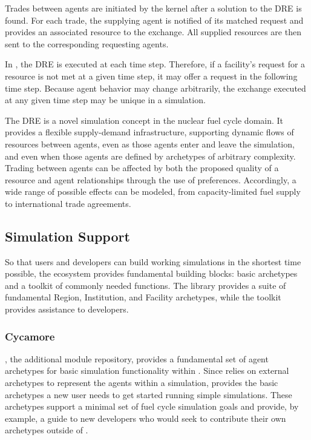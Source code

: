 Trades between agents are initiated by the \Cyclus kernel after a solution to
the \gls{DRE} is found. For each trade, the supplying agent is notified of its
matched request and provides an associated resource to the exchange. All
supplied resources are then sent to the corresponding requesting agents.

In \Cyclus, the \gls{DRE} is executed at each time step. Therefore, if a
facility's request for a resource is not met at a given time step, it may offer
a request in the following time step. Because agent behavior may change
arbitrarily, the exchange executed at any given time step may be unique in a
simulation.

The \gls{DRE} is a novel simulation concept in the nuclear fuel cycle domain. It
provides a flexible supply-demand infrastructure, supporting dynamic flows of
resources between agents, even as those agents enter and leave the simulation, and
even when those agents are defined by archetypes of arbitrary complexity. Trading
between agents can be affected by both the
proposed quality of a resource and agent relationships through the use of
preferences. Accordingly, a wide range of possible effects can be
modeled, from capacity-limited fuel supply to international trade agreements.

\subsection{Simulation Support}
So that users and developers can build working simulations in the shortest time
possible, the \Cyclus ecosystem provides fundamental building blocks: basic
archetypes and a toolkit of commonly needed functions.  The \Cycamore library
provides a suite of fundamental Region, Institution, and Facility archetypes,
while the \Cyclus toolkit provides assistance to developers.

\subsubsection{Cycamore}

\Cycamore \cite{carlsen_cycamore_2014}, the \Cyclus additional module
repository, provides a fundamental set of agent archetypes for basic simulation
functionality within \Cyclus.  Since \Cyclus relies on external
archetypes to represent the agents within a simulation, \Cycamore provides the
basic archetypes a new user needs to get started running simple simulations.
These archetypes support a minimal set of fuel cycle simulation goals and
provide, by example, a guide to new developers who would seek to contribute
their own archetypes outside of \Cycamore.

